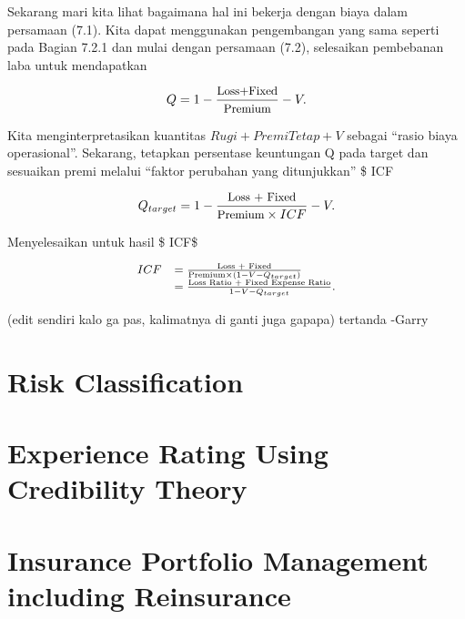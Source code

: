 \documentclass[
]{book}
\begin{document}
Sekarang mari kita lihat bagaimana hal ini bekerja dengan biaya dalam persamaan (7.1). Kita dapat menggunakan pengembangan yang sama seperti pada Bagian 7.2.1 dan mulai dengan persamaan (7.2), selesaikan pembebanan laba untuk mendapatkan

\begin{equation}
\small{
Q = 1 - \frac{\text{Loss+Fixed}}{\text{Premium}} - V .
}
\end{equation}

Kita menginterpretasikan kuantitas \(Rugi + Premi Tetap + V\) sebagai ``rasio biaya operasional''. Sekarang, tetapkan persentase keuntungan Q pada target dan sesuaikan premi melalui ``faktor perubahan yang ditunjukkan'' \$ ICF

\begin{equation}
\small{
Q_{target} = 1
-\frac{\text{Loss + Fixed}}{\text{Premium}\times ICF} - V .
}
\end{equation}

Menyelesaikan untuk hasil \$ ICF\$

\begin{equation}
{\small
\begin{array}{ll}
ICF &= \frac{\text{Loss + Fixed}}{\text{Premium} \times (1 - V - Q_{target})} \\
&= \frac{\text{Loss Ratio + Fixed Expense Ratio}}{1 - V - Q_{target}} .
\end{array}
}
\end{equation}

(edit sendiri kalo ga pas, kalimatnya di ganti juga gapapa)
tertanda -Garry

\hypertarget{risk-classification}{%
\chapter{Risk Classification}\label{risk-classification}}

\hypertarget{experience-rating-using-credibility-theory}{%
\chapter{Experience Rating Using Credibility Theory}\label{experience-rating-using-credibility-theory}}

\hypertarget{insurance-portfolio-management-including-reinsurance}{%
\chapter{Insurance Portfolio Management including Reinsurance}\label{insurance-portfolio-management-including-reinsurance}}
\end{document}
